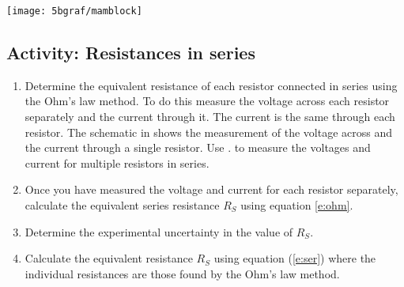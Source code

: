 \begin{multicols}{2}
\begin{enumerate}
\end{enumerate}


\begin{center}
	\texttt{[image: 5bgraf/mamblock]} %
	\label{f:mamblock} %
\end{center}

\subsection{Activity: Resistances in series} \label{s:series}
\begin{enumerate}
	\item \label{l:eqs} Determine the equivalent resistance of each resistor connected in series using the Ohm's law method. To do this measure the voltage across each resistor separately and the current through it. The current is the same through each resistor. The schematic in  shows the measurement of the voltage across and the current through a single resistor. Use  . to measure the voltages and current for multiple resistors in series.
	
	\item Once you have measured the voltage and current for each resistor separately, calculate the equivalent series resistance $R_S$ using equation \ref{e:ohm}.
	
	\item Determine the experimental uncertainty in the value of $R_S$. %
	
	\item Calculate the equivalent resistance $R_S$ using equation (\ref{e:ser}) where the individual resistances are those found by the Ohm's law method. %
\end{enumerate}


\end{multicols}
